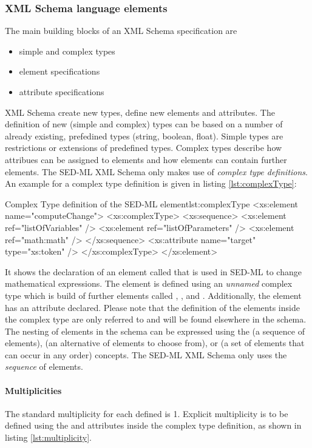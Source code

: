 \subsubsection{XML Schema language elements}
The main building blocks of an XML Schema specification are
\begin{itemize}
\item {simple and complex types}
\item {element specifications}
\item {attribute specifications}
\end{itemize}
XML Schema  create new types,  define new elements and attributes.
The definition of new (simple and complex) types can be based on a number of already existing, prefedined types (string, boolean, float). Simple types are restrictions or extensions of predefined types. Complex types describe how attribues can be assigned to elements and how elements can contain further elements. The SED-ML XML Schema only  makes use of \emph{complex type definitions}.
An example for a complex type definition is given in listing \ref{lst:complexType}:
%
\begin{myXmlLst}{Complex Type definition of the SED-ML  element}{lst:complexType}
<xs:element name="computeChange">
 <xs:complexType>
  <xs:sequence>
   <xs:element ref="listOfVariables" />
   <xs:element ref="listOfParameters" />
   <xs:element ref="math:math" />
  </xs:sequence>
  <xs:attribute name="target" type="xs:token" />
 </xs:complexType>
</xs:element>
\end{myXmlLst}
%
It shows the declaration of an element called  that is used in SED-ML to change mathematical expressions. The element is defined using an \emph{unnamed} complex type which is build of further elements called , , and . 
Additionally, the element  has an attribute  declared. Please note that the definition of the elements inside the complex type are only referred to and will be found elsewhere in the schema.
The nesting of elements in the schema can be expressed using the  (a sequence of elements),  (an alternative of elements to choose from), or  (a set of elements that can occur in any order) concepts. The SED-ML XML Schema only uses the \emph{sequence} of elements. 

\paragraph{Multiplicities}
The standard multiplicity for each defined  is 1. Explicit multiplicity is to be defined using the  and  attributes inside the complex type definition, as shown in listing \ref{lst:multiplicity}.

